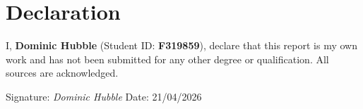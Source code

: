 \chapter*{Declaration}

I, \textbf{Dominic Hubble} (Student ID: \textbf{F319859}), declare that this report is my own work and has not been submitted for any other degree or qualification. All sources are acknowledged.

\vspace{1cm}
Signature: \textit{Dominic Hubble}\hspace{2.5cm} Date: 21/04/2026
